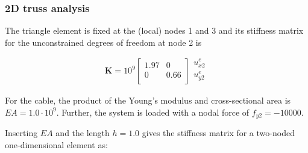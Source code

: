 \documentclass[notes]{beamer}
\begin{document}
\begin{frame}
\frametitle{2D truss analysis}

The triangle element is fixed at the (local) nodes 1 and 3 and its stiffness matrix for the
unconstrained degrees of freedom at node 2 is

\begin{equation*}
\mathbf{K} = 10^9 %
\begin{bmatrix}
1.97	& 0 \\ 
0 & 0.66 \\
\end{bmatrix}
%
\begin{matrix}
u_{x2}^e\\ 
u_{y2}^e \\
\end{matrix}	
\end{equation*}

For the cable, the product of the Young’s modulus and cross-sectional area is $EA = 1.0\cdot 10^9$.
Further, the system is loaded with a nodal force of $f_{y2} = -10000$.

Inserting $EA$ and the length $h = 1.0$ gives the stiffness matrix for a two-noded one-dimensional element as:
\end{frame}
\end{document}
